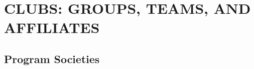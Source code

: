 


% 

\hypertarget{clubs-groups-teams-and-affiliates}{%
 \section{CLUBS: GROUPS, TEAMS, AND AFFILIATES}
 \label{clubs-groups-teams-and-affiliates}}

\hypertarget{program-societies}{%
 \subsection{Program Societies}
 \label{program-societies}}
